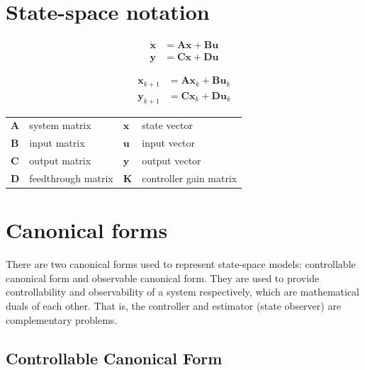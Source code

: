 \documentclass[10pt,conference,compsoc]{IEEEtran}
\newcommand{\mtx}[1] {\bm #1}
\begin{document}
\section{State-space notation}

\begin{align}
  \dot{\mtx{x}} &= \mtx{A}\mtx{x} + \mtx{B}\mtx{u} \label{eq:s_ctrl_x} \\
  \mtx{y} &= \mtx{C}\mtx{x} + \mtx{D}\mtx{u} \label{eq:s_ctrl_y}
\end{align}

\begin{align}
  \mtx{x}_{k+1} &= \mtx{A}\mtx{x}_k + \mtx{B}\mtx{u}_k \label{eq:z_ctrl_x} \\
  \mtx{y}_{k+1} &= \mtx{C}\mtx{x}_k + \mtx{D}\mtx{u}_k \label{eq:z_ctrl_y}
\end{align}

\begin{table}[ht]
  \renewcommand{\arraystretch}{1.3}
  \centering
  \begin{tabulary}{\linewidth}{LLLL}
    $\mtx{A}$ & system matrix      & $\mtx{x}$ & state vector \\
    $\mtx{B}$ & input matrix       & $\mtx{u}$ & input vector \\
    $\mtx{C}$ & output matrix      & $\mtx{y}$ & output vector \\
    $\mtx{D}$ & feedthrough matrix & $\mtx{K}$ & controller gain matrix \\
  \end{tabulary}
  \label{tab:ctrl_def}
\end{table}

\section{Canonical forms}

There are two canonical forms used to represent state-space models: controllable
canonical form and observable canonical form. They are used to provide
controllability and observability of a system respectively, which are
mathematical duals of each other. That is, the controller and estimator (state
observer) are complementary problems. \\

\subsection{Controllable Canonical Form} \label{subsec:ctrl_canon}
\end{document}
